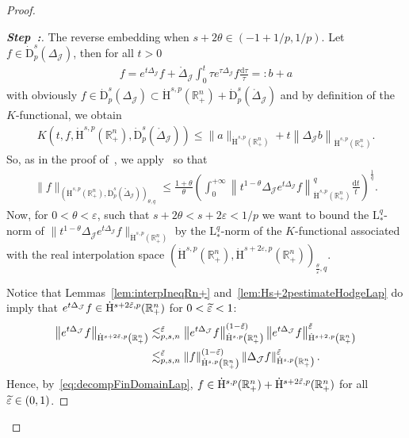 \documentclass[10pt]{amsart}
\theoremstyle{definition}\newtheorem{defi}[theo]{Definition}\newtheorem{rema}[theo]{Remark}\newtheorem{exam}[theo]{Example}\newtheorem{exem}[theo]{Example}\newtheorem{nota}[theo]{Notation}
\newcommand{\bbR}{\mathbb{R}}
\newcommand{\rmH}{\mathrm{H}}%
\newcommand{\rmd}{\mathrm{d}}
\newcommand{\rmD}{\mathrm{D}}
\newcommand{\rmL}{\mathrm{L}}
\newcommand{\clJ}{\mathcal{J}}
\newcounter{stepcount}
\newenvironment{step}{\refstepcounter{stepcount}\begin{proof}[\textbf{Step~\thestepcount:}]}{\let\qed\relax\end{proof}}
\let\oldtilde\tilde
\renewcommand*{\tilde}[1]{\mathchoice{\widetilde{#1}}{\widetilde{#1}}{\oldtilde{#1}}{\oldtilde{#1}}}
\begin{document}
\begin{proof}
\begin{step}\label{prfprop3.12stp2}
The reverse embedding when $s+2\theta\in(-1+1/p,1/p)$. Let $f\in \dot{\rmD}^{s}_{p}({{\Delta}}_{\clJ})$, then for all $t>0$
\begin{align}\label{eq:decompFinDomainLap}
f = e^{t\Delta_{\clJ}}f + \mathring{\Delta}_{\clJ}\int_{0}^{t} \tau e^{\tau\Delta_{\clJ}}f \frac{\rmd\tau}{\tau} =: b + a
\end{align}
with obviously $f\in \dot{\rmD}^{s}_{p}({{\Delta}}_{\clJ})\subset \dot{\rmH}^{s,p}(\bbR^n_+)+\dot{\rmD}^{s}_{p}(\mathring{\Delta}_\clJ)$ and by definition of the $K$-functional, we obtain
\begin{align*}
K\left(t,f,\dot{\rmH}^{s,p}\left(\bbR^n_+\right),\dot{\rmD}^{s}_{p}\left(\mathring{\Delta}_\clJ\right)\right) \leqslant \| a \|_{\dot{\rmH}^{s,p}\left(\bbR^n_+\right)} + t\left\| {\Delta}_\clJ b \right\|_{\dot{\rmH}^{s,p}\left(\bbR^n_+\right)} .
\end{align*}
So, as in the proof of~\cite[Proposition~4.12]{DanchinHieberMuchaTolk2020}, we apply~\cite[Lemma~2.11]{DanchinHieberMuchaTolk2020} so that
\begin{align}\label{eq:referenceEstimate}
\| f \|_{\left(\dot{\rmH}^{s,p}\left(\bbR^n_+\right),
\dot{\rmD}^{s}_{p}\left(\mathring{\Delta}_\clJ\right)\right)_{\theta,q}} \leqslant \frac{1+\theta}{\theta} \left(\int_{0}^{+\infty} \left\| t^{1-\theta} \Delta_{\clJ}e^{t\Delta_{\clJ}} f\right\|_{\dot{\rmH}^{s,p}\left(\bbR^n_+\right)}^q \frac{\rmd t}{t} \right)^\frac{1}{q} .
\end{align}
Now, for $0<\theta<\varepsilon$, such that $s+2\theta<s+2\varepsilon<1/p$ we want to bound the $\rmL^q_\ast$-norm of $\| t^{1-\theta} \Delta_{\clJ}e^{t\Delta_{\clJ}} f\|_{\dot{\rmH}^{s,p}(\bbR^n_+)}$ by the $\rmL^q_\ast$-norm of the $K$-functional associated with the real interpolation space $(\dot{\rmH}^{s,p}(\bbR^n_+),\dot{\rmH}^{s+2\varepsilon,p}(\bbR^n_+))_{\frac{\theta}{\varepsilon},q}$.

Notice that Lemmas~\ref{lem:interpIneqRn+} and~\ref{lem:Hs+2pestimateHodgeLap} do imply that $e^{t\Delta_\clJ}f\in \dot{\rmH}^{s+2\tilde{\varepsilon},p}(\bbR^n_+)$ for $0<\tilde{\varepsilon}<1$:
\begin{align*}
\left\| e^{t\Delta_\clJ}f\right\|_{\dot{\rmH}^{s+2\tilde{\varepsilon},p}\left(\bbR^n_+\right)}&\lesssim_{p,s,n}^{\tilde{\varepsilon}}
\left\| e^{t\Delta_\clJ}f\right\|_{\dot{\rmH}^{s,p}\left(\bbR^n_+\right)}^{\left(1-\tilde{\varepsilon}\right)}\left\| e^{t\Delta_\clJ}f\right\|_{\dot{\rmH}^{s+2,p}\left(\bbR^n_+\right)}^{\tilde{\varepsilon}}\\
&\lesssim_{p,s,n}^{\tilde{\varepsilon}}\| f\|_{\dot{\rmH}^{s,p}\left(\bbR^n_+\right)}^{\left(1-\tilde{\varepsilon}\right)}\left\| \Delta_\clJ f\right\|_{\dot{\rmH}^{s,p}\left(\bbR^n_+\right)}^{\tilde{\varepsilon}}.
\end{align*}
Hence, by~\eqref{eq:decompFinDomainLap}, $f\in \dot{\rmH}^{s,p}(\bbR^n_+)+\dot{\rmH}^{s+2\tilde{\varepsilon},p}(\bbR^n_+)$ for all $\Tilde{\varepsilon}\in(0,1)$.


\end{step}
\end{proof}
\end{document}
